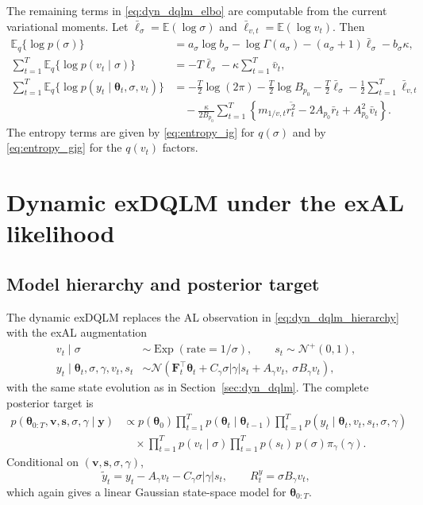 \documentclass[nojss,noheadings]{jss}
\renewcommand{\E}{\mathbb{E}}
\newcommand{\vect}[1]{\bm{#1}}
\newcommand{\mat}[1]{\mathbf{#1}}
\newcommand{\N}{\mathcal{N}}
\newcommand{\TNp}{\mathcal{N}^{+}}
\newcommand{\Exp}{\operatorname{Exp}}
\newcommand{\pigamma}{\pi_\gamma}
\begin{document}
The remaining terms in \eqref{eq:dyn_dqlm_elbo} are computable from the
current variational moments. Let
$\bar\ell_\sigma=\E(\log\sigma)$ and
$\bar\ell_{v,t}=\E(\log v_t)$. Then
\begin{align}
\E_q\{\log p(\sigma)\}
&=
a_\sigma\log b_\sigma-\log\Gamma(a_\sigma)
-(a_\sigma+1)\bar\ell_\sigma-b_\sigma\kappa,\\
\sum_{t=1}^T\E_q\{\log p(v_t\mid\sigma)\}
&=
-T\bar\ell_\sigma-\kappa\sum_{t=1}^T\bar v_t,\\
\sum_{t=1}^T\E_q\{\log p(y_t\mid\vect{\theta}_t,\sigma,v_t)\}
&=
-\frac{T}{2}\log(2\pi)-\frac{T}{2}\log B_{p_0}
-\frac{T}{2}\bar\ell_\sigma
-\frac{1}{2}\sum_{t=1}^T\bar\ell_{v,t}\nonumber\\
&\quad
-\frac{\kappa}{2B_{p_0}}\sum_{t=1}^T
\left\{m_{1/v,t}\overline{r_t^2}-2A_{p_0}\bar r_t+A_{p_0}^2\bar v_t\right\}.
\label{eq:dyn_dqlm_elbo_terms}
\end{align}
The entropy terms are given by \eqref{eq:entropy_ig} for $q(\sigma)$ and by
\eqref{eq:entropy_gig} for the $q(v_t)$ factors.

\section{Dynamic exDQLM under the exAL likelihood}
\label{sec:dyn_exdqlm}

\subsection{Model hierarchy and posterior target}

The dynamic exDQLM replaces the AL observation in
\eqref{eq:dyn_dqlm_hierarchy} with the exAL augmentation
\begin{align}
v_t\mid\sigma &\sim \Exp(\text{rate}=1/\sigma), \qquad
s_t\sim\TNp(0,1), \\
y_t\mid\vect{\theta}_t,\sigma,\gamma,v_t,s_t
&\sim
\N\left(
\mat{F}_t^\top\vect{\theta}_t+C_\gamma\sigma|\gamma|s_t+A_\gamma v_t,\
\sigma B_\gamma v_t
\right),
\label{eq:dyn_exdqlm_obs}
\end{align}
with the same state evolution as in Section~\ref{sec:dyn_dqlm}. The complete
posterior target is
\begin{align}
p(\vect{\theta}_{0:T},\vect{v},\vect{s},\sigma,\gamma\mid\vect{y})
&\propto
p(\vect{\theta}_0)\prod_{t=1}^Tp(\vect{\theta}_t\mid\vect{\theta}_{t-1})
\prod_{t=1}^Tp(y_t\mid\vect{\theta}_t,v_t,s_t,\sigma,\gamma) \nonumber\\
&\quad\times
\prod_{t=1}^Tp(v_t\mid\sigma)\prod_{t=1}^Tp(s_t)\,p(\sigma)\pigamma(\gamma).
\label{eq:dyn_exdqlm_joint}
\end{align}
Conditional on $(\vect{v},\vect{s},\sigma,\gamma)$,
\begin{equation}
\tilde y_t=y_t-A_\gamma v_t-C_\gamma\sigma|\gamma|s_t,\qquad
R^y_t=\sigma B_\gamma v_t,
\label{eq:dyn_exdqlm_pseudo}
\end{equation}
which again gives a linear Gaussian state-space model for
$\vect{\theta}_{0:T}$.
\end{document}
